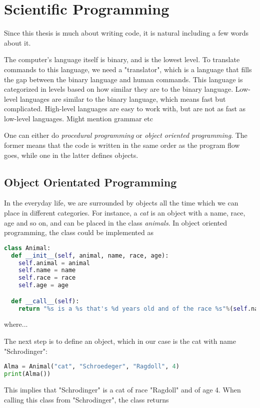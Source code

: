 \chapter{Scientific Programming} \label{chp:scientificprogramming}
Since this thesis is much about writing code, it is natural including a few words about it. 

The computer's language itself is binary, and is the lowest level. To translate commands to this language, we need a "translator", which is a language that fills the gap between the binary language and human commands. This language is categorized in levels based on how similar they are to the binary language. Low-level languages are similar to the binary language, which means fast but complicated. High-level languages are easy to work with, but are not as fast as low-level languages. Might mention grammar etc

One can either do \textit{procedural programming} or \textit{object oriented programming}. The former means that the code is written in the same order as the program flow goes, while one in the latter defines objects. 

\section{Object Orientated Programming}
In the everyday life, we are surrounded by objects all the time which we can place in different categories. For instance, a \textit{cat} is an object with a name, race, age and so on, and can be placed in the class \textit{animals}. In object oriented programming, the class could be implemented as

\lstset{basicstyle=\scriptsize}
\begin{lstlisting}[language=python]
class Animal:
  def __init__(self, animal, name, race, age):
    self.animal = animal
    self.name = name
    self.race = race
    self.age = age

  def __call__(self):
    return "%s is a %s that's %d years old and of the race %s"%(self.name, self.animal, self.age, self.race)
\end{lstlisting}
where...

The next step is to define an object, which in our case is the cat with name "Schrodinger":

\lstset{basicstyle=\scriptsize}
\begin{lstlisting}[language=python]
Alma = Animal("cat", "Schroedeger", "Ragdoll", 4)
print(Alma())
\end{lstlisting}
This implies that "Schrodinger" is a cat of race "Ragdoll" and of age 4. When calling this class from "Schrodinger", the class returns

